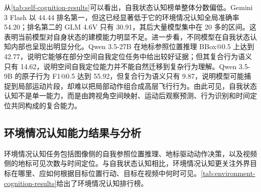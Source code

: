 从\autoref{tab:self-cognition-results}可以看出，自我状态认知榜单整体分数偏低。Gemini 3 Flash 以 44.44 排名第一，但这已经显著低于它的环境情况认知全局准确率 54.20；排名第二的 GLM 4.6V 只有 30.91，其后大量模型集中在 20 多的区间。这表明当前模型对自身状态的建模能力明显不足。进一步看，不同模型在自我状态认知内部也呈现出明显分化。Qwen 3.5-27B 在地标参照位置推理 BBox@0.5 上达到 42.77，说明它能够在部分空间自我定位任务中给出较好证据；但其复合行为语义只有 14.62，说明空间自我定位能力并不能自然迁移到复杂行为理解。Qwen 3.5-9B 的原子行为 F1@0.5 达到 55.92，但复合行为语义只有 9.87，说明模型可能捕捉到局部运动片段，却难以把局部动作组合成高层飞行行为。由此可见，自我状态认知不是单一能力，而是由跨视角空间映射、运动后观察预测、行为识别和时间定位共同构成的复合能力。

\subsection{环境情况认知能力结果与分析}

环境情况认知任务包括图像侧的自我参照位置推理、地标驱动动作决策，以及视频侧的地标可见次数与时间定位。与自我状态认知相比，环境情况认知更关注外界目标在哪里、应如何根据目标位置行动、目标在视频中何时可见。\autoref{tab:environment-cognition-results}给出了环境情况认知排行榜。

